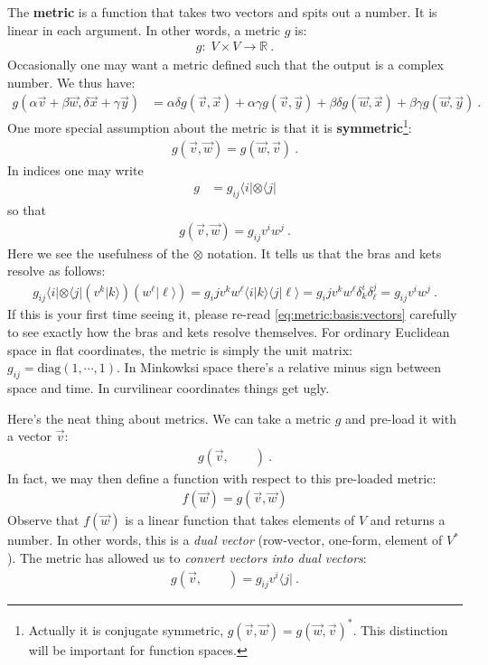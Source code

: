 The \textbf{metric} is a function that takes two vectors and spits out a number. It is linear in each argument. In other words, a metric $g$ is:
\begin{align}
  g:\; V\times V\to \mathbb{R} \ .
\end{align}
Occasionally one may want a metric defined such that the output is a complex number. We thus have:
\begin{align}
  g(\alpha \vec{v} + \beta\vec{w}, \delta \vec{x} + \gamma \vec{y})
  &= 
  \alpha \delta g(\vec{v},\vec{x}) + \alpha \gamma g(\vec{v},\vec{y}) + \beta\delta g(\vec{w},\vec{x}) + \beta\gamma g(\vec{w},\vec{y}) \ .
\end{align}
One more special assumption about the metric is that it is \textbf{symmetric}\footnote{Actually it is conjugate symmetric, $g(\vec{v}, \vec{w}) = g(\vec w, \vec v)^*$. This distinction will be important for function spaces.}:
\begin{align}
  g(\vec{v},\vec{w}) = g(\vec{w}, \vec{v}) \ .
\end{align}
In indices one may write
\begin{align}
  g &= g_{ij} \langle i | \otimes \langle j |
\end{align}
so that
\begin{align}
  g(\vec{v}, \vec{w}) = g_{ij} v^{i}w^j \ .
 \end{align}
 Here we see the usefulness of the $\otimes$ notation. It tells us that the bras and kets resolve as follows:
 \begin{align}
   g_{ij}\langle i | \otimes \langle j | \left(v^k|k\rangle\right)\left(w^\ell|\ell\rangle\right) 
   = 
   g_ij v^k w^\ell 
   \langle i | k\rangle \langle j |\ell\rangle
   = 
   g_ij v^k w^\ell  \delta^i_k \delta^j_\ell 
   = 
   g_{ij} v^{i}w^j \ .
   \label{eq:metric:basis:vectors}
 \end{align}
 If this is your first time seeing it, please re-read \eqref{eq:metric:basis:vectors} carefully to see exactly how the bras and kets resolve themselves. 
 For ordinary Euclidean space in flat coordinates, the metric is simply the unit matrix: $g_{ij} = \text{diag}(1,\cdots, 1)$. In Minkowksi space there’s a relative minus sign between space and time. In curvilinear coordinates things get ugly. 
 
Here’s the neat thing about metrics. We can take a metric $g$ and pre-load it with a vector $\vec{v}$: 
\begin{align}
  g(\vec v,\qquad ) \ .
\end{align}
In fact, we may then define a function with respect to this pre-loaded metric:
\begin{align}
  f(\vec{w}) = g(\vec v,\vec w)
\end{align}
Observe that $f(\vec{w})$ is a linear function that takes elements of $V$ and returns a number. In other words, this is a \emph{dual vector} (row-vector, one-form, element of $V^*$). The metric has allowed us to \emph{convert vectors into dual vectors}:
\begin{align}
  g(\vec v,\qquad )  = g_{ij} v^i \langle j| \ .
  \label{sec:ket:as:pre:loaded:metric}
\end{align}

